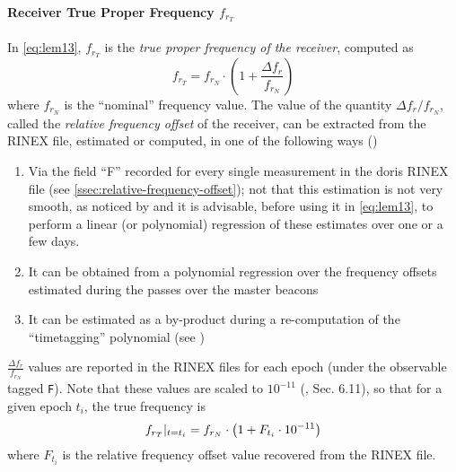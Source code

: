\paragraph{Receiver True Proper Frequency $f_{r_T}$}\label{par:receiver-true-proper-frequency}
In \autoref{eq:lem13}, $f_{r_T}$ is the \emph{true proper frequency of 
the receiver}, computed as
\begin{equation}\label{eq:frt-gen}
  f_{r_T} = f_{r_N} \cdot \left( 1 + \frac{\Delta f_r}{f_{r_N}} \right)
\end{equation}
where $f_{r_N}$ is the ``nominal'' frequency value. The value of the quantity 
$\Delta f_r / f_{r_N}$, called the \emph{relative frequency offset} of the receiver,
can be extracted from the RINEX file, estimated or computed, in one of the following 
ways (\cite{Lemoine2016})
\begin{enumerate}
    \item Via the field ``F'' recorded for every single measurement in the \gls{doris} 
      RINEX file (see \autoref{ssec:relative-frequency-offset}); not that this estimation 
      is not very smooth, as noticed by \cite{Gao2015} and it is advisable, before 
      using it in \autoref{eq:lem13}, to perform a linear (or polynomial) regression of 
      these estimates over one or a few days.
    \item It can be obtained from a polynomial regression over the frequency 
      offsets estimated during the passes over the master beacons
    \item It can be estimated as a by-product during a re-computation of the 
      ``timetagging'' polynomial (see \cite{Mercier2010})
\end{enumerate}

$\frac{\Delta f_r}{f_{r_N}}$ values are reported in the RINEX files for each epoch 
(under the observable tagged \texttt{F}). Note that these values are scaled to 
$10^{-11}$ (\cite{DORISRNX3}, Sec. 6.11), so that for a given epoch $t_i$, the 
true frequency is
\begin{equation}\label{eq:frt-rinex}
  f_{r_T}|_{t=t_i} = f_{r_N} \cdot \left( 1 + F_{t_i} \cdot 10^{-11} \right)
\end{equation}
where $F_{t_i}$ is the relative frequency offset value recovered from the RINEX 
file.

